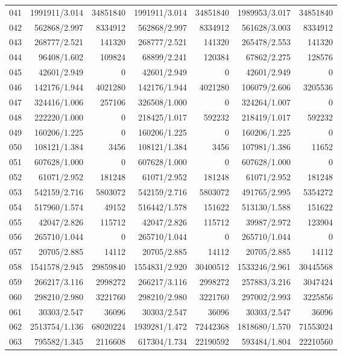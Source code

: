 \begin{longtable}{crrrrrr}
041 & 1991911/3.014 & 34851840 & 1991911/3.014 & 34851840 & 1989953/3.017 & 34851840 \\
042 & 562868/2.997 & 8334912 & 562868/2.997 & 8334912 & 561628/3.003 & 8334912 \\
043 & 268777/2.521 & 141320 & 268777/2.521 & 141320 & 265478/2.553 & 141320 \\
044 & 96408/1.602 & 109824 & 68899/2.241 & 120384 & 67862/2.275 & 128576 \\
045 & 42601/2.949 & 0 & 42601/2.949 & 0 & 42601/2.949 & 0 \\
046 & 142176/1.944 & 4021280 & 142176/1.944 & 4021280 & 106079/2.606 & 3205536 \\
047 & 324416/1.006 & 257106 & 326508/1.000 & 0 & 324264/1.007 & 0 \\
048 & 222220/1.000 & 0 & 218425/1.017 & 592232 & 218419/1.017 & 592232 \\
049 & 160206/1.225 & 0 & 160206/1.225 & 0 & 160206/1.225 & 0 \\
050 & 108121/1.384 & 3456 & 108121/1.384 & 3456 & 107981/1.386 & 11652 \\
051 & 607628/1.000 & 0 & 607628/1.000 & 0 & 607628/1.000 & 0 \\
052 & 61071/2.952 & 181248 & 61071/2.952 & 181248 & 61071/2.952 & 181248 \\
053 & 542159/2.716 & 5803072 & 542159/2.716 & 5803072 & 491765/2.995 & 5354272 \\
054 & 517960/1.574 & 49152 & 516442/1.578 & 151622 & 513130/1.588 & 151622 \\
055 & 42047/2.826 & 115712 & 42047/2.826 & 115712 & 39987/2.972 & 123904 \\
056 & 265710/1.044 & 0 & 265710/1.044 & 0 & 265710/1.044 & 0 \\
057 & 20705/2.885 & 14112 & 20705/2.885 & 14112 & 20705/2.885 & 14112 \\
058 & 1541578/2.945 & 29859840 & 1554831/2.920 & 30400512 & 1533246/2.961 & 30445568 \\
059 & 266217/3.116 & 2998272 & 266217/3.116 & 2998272 & 257883/3.216 & 3047424 \\
060 & 298210/2.980 & 3221760 & 298210/2.980 & 3221760 & 297002/2.993 & 3225856 \\
061 & 30303/2.547 & 36096 & 30303/2.547 & 36096 & 30303/2.547 & 36096 \\
062 & 2513754/1.136 & 68020224 & 1939281/1.472 & 72442368 & 1818680/1.570 & 71553024 \\
063 & 795582/1.345 & 2116608 & 617304/1.734 & 22190592 & 593484/1.804 & 22210560 \\

\end{longtable}
